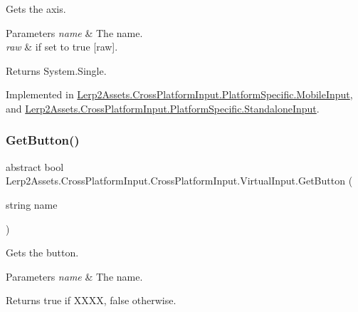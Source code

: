Gets the axis. 


\begin{DoxyParams}{Parameters}
{\em name} & The name.\\
\hline
{\em raw} & if set to {\ttfamily true} \mbox{[}raw\mbox{]}.\\
\hline
\end{DoxyParams}
\begin{DoxyReturn}{Returns}
System.\+Single.
\end{DoxyReturn}


Implemented in \hyperlink{class_lerp2_assets_1_1_cross_platform_input_1_1_platform_specific_1_1_mobile_input_a4bcf5ea3b75e24eba7c21b9a6cae3778}{Lerp2\+Assets.\+Cross\+Platform\+Input.\+Platform\+Specific.\+Mobile\+Input}, and \hyperlink{class_lerp2_assets_1_1_cross_platform_input_1_1_platform_specific_1_1_standalone_input_aee3650ff35b358d61f859bbeb3111e52}{Lerp2\+Assets.\+Cross\+Platform\+Input.\+Platform\+Specific.\+Standalone\+Input}.

\mbox{\label{class_lerp2_assets_1_1_cross_platform_input_1_1_cross_platform_input_1_1_virtual_input_a9ac8aa7751c188bb7b1320c7b2fea12e}} 
\subsubsection{\texorpdfstring{Get\+Button()}{GetButton()}}
{\footnotesize\ttfamily abstract bool Lerp2\+Assets.\+Cross\+Platform\+Input.\+Cross\+Platform\+Input.\+Virtual\+Input.\+Get\+Button (\begin{DoxyParamCaption}\item[{string}]{name }\end{DoxyParamCaption})\hspace{0.3cm}{\ttfamily [pure virtual]}}



Gets the button. 


\begin{DoxyParams}{Parameters}
{\em name} & The name.\\
\hline
\end{DoxyParams}
\begin{DoxyReturn}{Returns}
{\ttfamily true} if X\+X\+XX, {\ttfamily false} otherwise.
\end{DoxyReturn}


